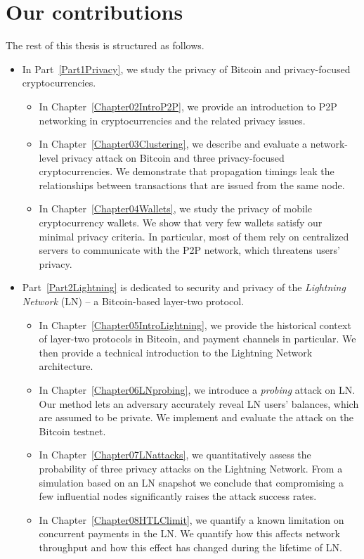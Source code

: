 \section{Our contributions}

The rest of this thesis is structured as follows.

\begin{itemize}
	\item 
	In Part~\ref{Part1Privacy}, we study the privacy of Bitcoin and privacy-focused cryptocurrencies.
	\begin{itemize}
		\item
	In Chapter~\ref{Chapter02IntroP2P}, we provide an introduction to P2P networking in cryptocurrencies and the related privacy issues.
		\item
	In Chapter~\ref{Chapter03Clustering}, we describe and evaluate a network-level privacy attack on Bitcoin and three privacy-focused cryptocurrencies.
	We demonstrate that propagation timings leak the relationships between transactions that are issued from the same node.
		\item
	In Chapter~\ref{Chapter04Wallets}, we study the privacy of mobile cryptocurrency wallets.
	We show that very few wallets satisfy our minimal privacy criteria.
	In particular, most of them rely on centralized servers to communicate with the P2P network, which threatens users' privacy.
	\end{itemize}

	\item
	Part~\ref{Part2Lightning} is dedicated to security and privacy of the \textit{Lightning Network} (LN) -- a Bitcoin-based layer-two protocol.
	\begin{itemize}
		\item 
	In Chapter~\ref{Chapter05IntroLightning}, we provide the historical context of layer-two protocols in Bitcoin, and payment channels in particular.
	We then provide a technical introduction to the Lightning Network architecture.
		\item
	In Chapter~\ref{Chapter06LNprobing}, we introduce a \textit{probing} attack on LN.
	Our method lets an adversary accurately reveal LN users' balances, which are assumed to be private.
	We implement and evaluate the attack on the Bitcoin testnet.
		\item
	In Chapter~\ref{Chapter07LNattacks}, we quantitatively assess the probability of three privacy attacks on the Lightning Network.
	From a simulation based on an LN snapshot we conclude that compromising a few influential nodes significantly raises the attack success rates.
		\item
	In Chapter~\ref{Chapter08HTLClimit}, we quantify a known limitation on concurrent payments in the LN.
	We quantify how this affects network throughput and how this effect has changed during the lifetime of LN.
	\end{itemize}


\end{itemize}

